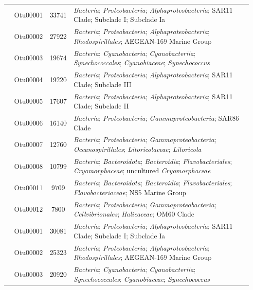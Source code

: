 \documentclass[
  12pt,
]{article}
\begin{document}
\begin{longtable}[t]{>{\centering\arraybackslash}m{8em}ccl}
\endfoot
\bottomrule
\endlastfoot
 & Otu00001 & 33741 & \textit{Bacteria}; \textit{Proteobacteria}; \textit{Alphaproteobacteria}; SAR11 Clade; Subclade I; Subclade Ia\\
\nopagebreak
 & Otu00002 & 27922 & \textit{Bacteria}; \textit{Proteobacteria}; \textit{Alphaproteobacteria}; \textit{Rhodospirillales}; AEGEAN-169 Marine Group\\
\nopagebreak
 & Otu00003 & 19674 & \textit{Bacteria}; \textit{Cyanobacteria}; \textit{Cyanobacteriia}; \textit{Synechococcales}; \textit{Cyanobiaceae}; \textit{Synechococcus}\\
\nopagebreak
 & Otu00004 & 19220 & \textit{Bacteria}; \textit{Proteobacteria}; \textit{Alphaproteobacteria}; SAR11 Clade; Subclade III\\
\nopagebreak
 & Otu00005 & 17607 & \textit{Bacteria}; \textit{Proteobacteria}; \textit{Alphaproteobacteria}; SAR11 Clade; Subclade II\\
\nopagebreak
 & Otu00006 & 16140 & \textit{Bacteria}; \textit{Proteobacteria}; \textit{Gammaproteobacteria}; SAR86 Clade\\
\nopagebreak
 & Otu00007 & 12760 & \textit{Bacteria}; \textit{Proteobacteria}; \textit{Gammaproteobacteria}; \textit{Oceanospirillales}; \textit{Litoricolaceae}; \textit{Litoricola}\\
\nopagebreak
 & Otu00008 & 10799 & \textit{Bacteria}; \textit{Bacteroidota}; \textit{Bacteroidia}; \textit{Flavobacteriales}; \textit{Cryomorphaceae}; uncultured \textit{Cryomorphaceae}\\
\nopagebreak
 & Otu00011 & 9709 & \textit{Bacteria}; \textit{Bacteroidota}; \textit{Bacteroidia}; \textit{Flavobacteriales}; \textit{Flavobacteriaceae}; NS5 Marine Group\\
\nopagebreak
\multirow{-10}{8em}{\centering\arraybackslash Bay of Saline} & Otu00012 & 7800 & \textit{Bacteria}; \textit{Proteobacteria}; \textit{Gammaproteobacteria}; \textit{Cellvibrionales}; \textit{Halieaceae}; OM60 Clade\\
\cmidrule{1-4}\pagebreak[0]
 & Otu00001 & 30081 & \textit{Bacteria}; \textit{Proteobacteria}; \textit{Alphaproteobacteria}; SAR11 Clade; Subclade I; Subclade Ia\\
\nopagebreak
 & Otu00002 & 25323 & \textit{Bacteria}; \textit{Proteobacteria}; \textit{Alphaproteobacteria}; \textit{Rhodospirillales}; AEGEAN-169 Marine Group\\
\nopagebreak
 & Otu00003 & 20920 & \textit{Bacteria}; \textit{Cyanobacteria}; \textit{Cyanobacteriia}; \textit{Synechococcales}; \textit{Cyanobiaceae}; \textit{Synechococcus}\\

\end{longtable}
\end{document}
